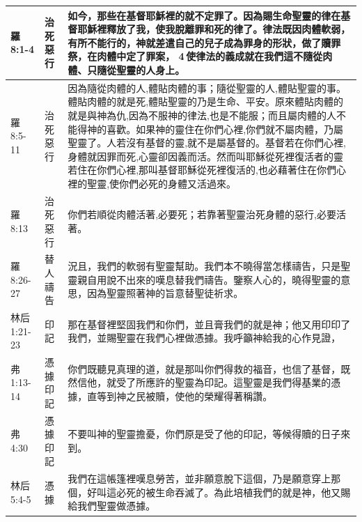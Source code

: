 \begin{table}[H]
\begin{tabular}{p{6em}|p{4em}|p{37em}}
羅8:1-4&治死惡行&如今，那些在基督耶穌裡的就不定罪了。因為賜生命聖靈的律在基督耶穌裡釋放了我，使我脫離罪和死的律了。律法既因肉體軟弱，有所不能行的，神就差遣自己的兒子成為罪身的形狀，做了贖罪祭，在肉體中定了罪案， 4 使律法的義成就在我們這不隨從肉體、只隨從聖靈的人身上。\\  \midrule

羅8:5-11&治死惡行&因為隨從肉體的人,體貼肉體的事；隨從聖靈的人,體貼聖靈的事。體貼肉體的就是死,體貼聖靈的乃是生命、平安。原來體貼肉體的就是與神為仇,因為不服神的律法,也是不能服；而且屬肉體的人不能得神的喜歡。如果神的靈住在你們心裡,你們就不屬肉體，乃屬聖靈了。人若沒有基督的靈,就不是屬基督的。基督若在你們心裡,身體就因罪而死,心靈卻因義而活。然而叫耶穌從死裡復活者的靈若住在你們心裡,那叫基督耶穌從死裡復活的,也必藉著住在你們心裡的聖靈,使你們必死的身體又活過來。\\  \midrule

羅8:13&治死惡行&你們若順從肉體活著,必要死；若靠著聖靈治死身體的惡行,必要活著。\\ 
 \midrule


羅8:26-27&替人禱告&況且，我們的軟弱有聖靈幫助。我們本不曉得當怎樣禱告，只是聖靈親自用說不出來的嘆息替我們禱告。鑒察人心的，曉得聖靈的意思，因為聖靈照著神的旨意替聖徒祈求。\\  \midrule


林后1:21-23&印記&那在基督裡堅固我們和你們，並且膏我們的就是神；他又用印印了我們，並賜聖靈在我們心裡做憑據。我呼籲神給我的心作見證，\\  \midrule
弗1:13-14&憑據印記&你們既聽見真理的道，就是那叫你們得救的福音，也信了基督，既然信他，就受了所應許的聖靈為印記。這聖靈是我們得基業的憑據，直等到神之民被贖，使他的榮耀得著稱讚。\\  \midrule
弗4:30&憑據印記&不要叫神的聖靈擔憂，你們原是受了他的印記，等候得贖的日子來到。\\  \midrule
林后5:4-5&憑據&我們在這帳篷裡嘆息勞苦，並非願意脫下這個，乃是願意穿上那個，好叫這必死的被生命吞滅了。為此培植我們的就是神，他又賜給我們聖靈做憑據。\\  \midrule

\end{tabular}%
\end{table}



